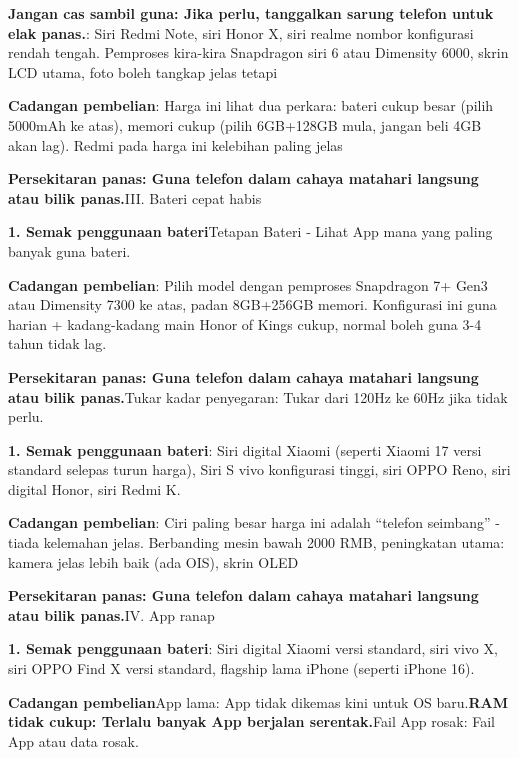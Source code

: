 \textbf{Jangan cas sambil guna: Jika perlu, tanggalkan sarung telefon untuk elak panas.}: Siri Redmi Note, siri Honor X, siri realme nombor konfigurasi rendah tengah. Pemproses kira-kira Snapdragon siri 6 atau Dimensity 6000, skrin LCD utama, foto boleh tangkap jelas tetapi

\textbf{Cadangan pembelian}: Harga ini lihat dua perkara: bateri cukup besar (pilih 5000mAh ke atas), memori cukup (pilih 6GB+128GB mula, jangan beli 4GB akan lag). Redmi pada harga ini kelebihan paling jelas


\textbf{Persekitaran panas: Guna telefon dalam cahaya matahari langsung atau bilik panas.}III. Bateri cepat habis

\textbf{1. Semak penggunaan bateri}Tetapan Bateri ‑ Lihat App mana yang paling banyak guna bateri.

\textbf{Cadangan pembelian}: Pilih model dengan pemproses Snapdragon 7+ Gen3 atau Dimensity 7300 ke atas, padan 8GB+256GB memori. Konfigurasi ini guna harian + kadang-kadang main Honor of Kings cukup, normal boleh guna 3-4 tahun tidak lag.


\textbf{Persekitaran panas: Guna telefon dalam cahaya matahari langsung atau bilik panas.}Tukar kadar penyegaran: Tukar dari 120Hz ke 60Hz jika tidak perlu.

\textbf{1. Semak penggunaan bateri}: Siri digital Xiaomi (seperti Xiaomi 17 versi standard selepas turun harga), Siri S vivo konfigurasi tinggi, siri OPPO Reno, siri digital Honor, siri Redmi K.

\textbf{Cadangan pembelian}: Ciri paling besar harga ini adalah “telefon seimbang” - tiada kelemahan jelas. Berbanding mesin bawah 2000 RMB, peningkatan utama: kamera jelas lebih baik (ada OIS), skrin OLED


\textbf{Persekitaran panas: Guna telefon dalam cahaya matahari langsung atau bilik panas.}IV. App ranap

\textbf{1. Semak penggunaan bateri}: Siri digital Xiaomi versi standard, siri vivo X, siri OPPO Find X versi standard, flagship lama iPhone (seperti iPhone 16).

\textbf{Cadangan pembelian}App lama: App tidak dikemas kini untuk OS baru.\textbf{RAM tidak cukup: Terlalu banyak App berjalan serentak.}Fail App rosak: Fail App atau data rosak.

